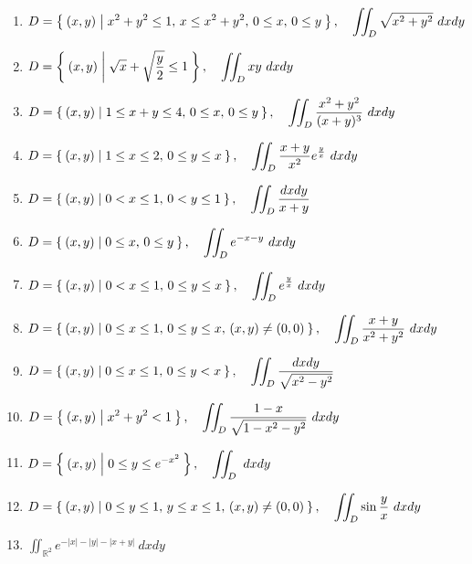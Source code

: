 \documentclass[11pt, uplatex, dvipdfmx]{jsarticle}
\newcommand{\ds}{\displaystyle}
\begin{document}
\begin{enumerate}[(1)]
  \item $\ds D = \Set{(x,y) | x^2+y^2 \leq 1, \, x \leq x^2+y^2, \, 0 \leq x , \, 0 \leq y }, \quad
    \iint_D \sqrt{x^2+y^2} \ dx dy$
    
  \item $\ds D=\Set{(x,y) | \sqrt{x} + \sqrt{\frac{y}{2}} \leq 1 }, \quad
    \iint_D xy \ dx dy$
    
  \item $\ds D =\Set{ (x,y) | 1 \leq x+y \leq 4, \, 0 \leq x, \, 0 \leq y }, \quad
    \iint_D \frac{x^2+y^2}{(x+y)^3} \ dx dy$
    
  \item $\ds D=\Set{(x,y) | 1 \leq x \leq 2, \, 0 \leq y \leq x }, 
    \quad \iint_D \frac{x+y}{x^2} e^{\frac{y}{x}} \ dx dy$
    
  \item $\ds D=\Set{(x,y) | 0< x \leq 1, \, 0 < y \leq 1},\quad
    \iint_D \frac{dxdy}{x+y}$

  \item $\ds D=\Set{(x,y) | 0 \leq x, \, 0 \leq y }, \quad
    \iint_D e^{-x-y} \ dx dy$

  \item $\ds D=\Set{(x,y) | 0 < x \leq 1, \, 0 \leq y \leq x}, \quad 
    \iint_D e^{\frac{y}{x}} \ dx dy$

  \item $\ds D=\Set{(x,y) | 0 \leq x \leq 1, \, 0 \leq y \leq x, \, (x,y) \neq (0,0)}, \quad
    \iint_D \frac{x+y}{x^2+y^2} \ dx dy$
    
  \item $\ds D=\Set{(x,y) | 0 \leq x \leq 1, \, 0 \leq y <x }, \quad
    \iint_D \frac{dx dy}{\sqrt{x^2-y^2}}$

  \item $\ds D=\Set{(x,y) | x^2+y^2 < 1}, \quad
    \iint_D \frac{1-x}{\sqrt{1-x^2-y^2}} \ dx dy$

  \item $\ds D=\Set{ (x,y) | 0 \leq  y \leq e^{-x^2} }, \quad
    \iint_D \ dx dy$
    
  \item $\ds D=\Set{(x,y) | 0 \leq y \leq 1, \, y \leq x \leq 1, \, (x,y) \neq (0,0)}, \quad
    \iint_D \sin \frac{y}{x} \ dx dy$

  \item $\ds \iint_{\mathbb{R}^2} e^{-|x|-|y|-|x+y|} \ dx dy$

  \end{enumerate}


\newpage
\end{document}
